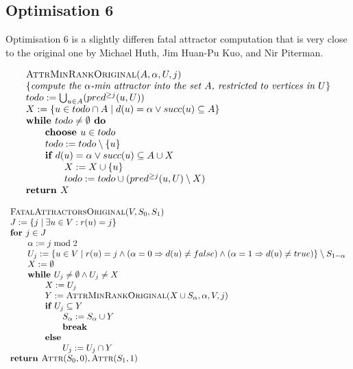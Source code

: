 \documentclass{article}
\begin{document}
\subsection{Optimisation 6}
Optimisation 6 is a slightly differen fatal attractor computation that is very close to the
original one by Michael Huth, Jim Huan-Pu Kuo, and Nir Piterman.

\begin{equation*}
\begin{array}{l}
\text{\textsc{AttrMinRankOriginal}}(A, \alpha, U, j) \\
\{\textit{compute the $\alpha$-min attractor into the set $A$, restricted to vertices in $U$}\}\\
todo := \bigcup_{u \in A} (%
pred^{\geq j}(u, U) ) \\
X := \{ u \in todo \cap A \mid d(u) = \alpha \vee succ(u) \subseteq A \} \\
\textbf{while } todo \neq \emptyset \textbf{ do} \\
\qquad \textbf{choose } u \in todo \\
\qquad todo := todo \setminus \{u\} \\
\qquad \textbf{if } d(u) = \alpha \vee succ(u) \subseteq A \cup X \\
\qquad \qquad X := X \cup \{u \} \\
\qquad \qquad todo := todo \cup (%
pred^{\geq j}(u, U) \setminus X)  \\
\textbf{return } X
\end{array}
\end{equation*}

\begin{equation*}
\begin{array}{l}
\text{\textsc{FatalAttractorsOriginal}}(V, S_0, S_1)\\
J := \{ j \mid \exists u \in V : r(u) = j \} \\
\textbf{for } j \in J \\
\qquad \alpha := j \bmod 2\\
\qquad U_j := \{u \in V \mid r(u) = j \wedge (\alpha = 0 \Rightarrow d(u) \neq false) 
\wedge (\alpha = 1 \Rightarrow d(u) \neq true) \} \setminus S_{1-\alpha} \\
\qquad X := \emptyset \\
\qquad \textbf{while } U_j \neq \emptyset \wedge U_j \neq X \\ 
\qquad \qquad X := U_j\\
\qquad \qquad Y := \textsc{AttrMinRankOriginal}(X \cup S_\alpha, \alpha, V, j) \\
\qquad \qquad \textbf{if } U_j \subseteq Y \\
\qquad \qquad \qquad S_\alpha := S_\alpha \cup Y \\
\qquad \qquad \qquad \textbf{break} \\
\qquad \qquad \textbf{else }\\
\qquad \qquad \qquad U_j := U_j \cap Y\\
\textbf{return } \textsc{Attr}(S_0, 0), \textsc{Attr}(S_1, 1)
\end{array}
\end{equation*}
\end{document}
